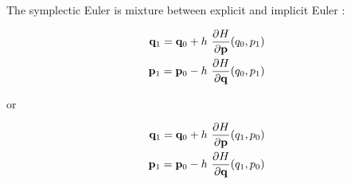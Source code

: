 The symplectic Euler is mixture between explicit and implicit Euler \cite{Hairer}:

\begin{equation}
    \begin{split} \label{eq:symplectic-euler1}
        \mathbf{q}_1 = \mathbf{q}_0 + h \operatorname{}\frac{\partial H}{\partial \mathbf{p}}(q_0, p_1) \\
        \mathbf{p}_1 = \mathbf{p}_0 - h \operatorname{}\frac{\partial H}{\partial \mathbf{q}}(q_0, p_1)
    \end{split}
\end{equation}

or

\begin{equation}
    \begin{split} \label{eq:symplectic-euler2}
        \mathbf{q}_1 = \mathbf{q}_0 + h \operatorname{}\frac{\partial H}{\partial \mathbf{p}}(q_1, p_0) \\
        \mathbf{p}_1 = \mathbf{p}_0 - h \operatorname{}\frac{\partial H}{\partial \mathbf{q}}(q_1, p_0)
    \end{split}
\end{equation}

